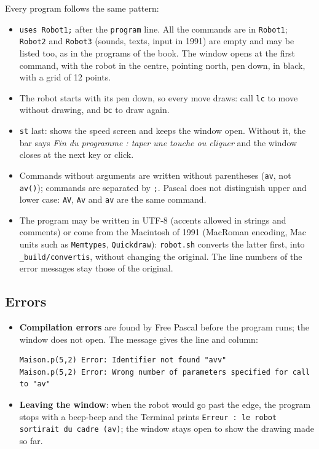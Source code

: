 \documentclass[11pt,a4paper]{article}
\newcommand{\kbd}[1]{\texttt{#1}}
\begin{document}
Every program follows the same pattern:
\begin{itemize}
\item \kbd{uses Robot1;} after the \kbd{program} line. All the commands are
  in \kbd{Robot1}; \kbd{Robot2} and \kbd{Robot3} (sounds, texts, input in
  1991) are empty and may be listed too, as in the programs of the book.
  The window opens at the first command, with the robot in the centre,
  pointing north, pen down, in black, with a grid of 12 points.
\item The robot starts with its pen down, so every move draws: call
  \kbd{lc} to move without drawing, and \kbd{bc} to draw again.
\item \kbd{st} last: shows the speed screen and keeps the window open.
  Without it, the bar says \emph{Fin du programme : taper une touche ou
  cliquer} and the window closes at the next key or click.
\item Commands without arguments are written without parentheses
  (\kbd{av}, not \kbd{av()}); commands are separated by \kbd{;}. Pascal
  does not distinguish upper and lower case: \kbd{AV}, \kbd{Av} and
  \kbd{av} are the same command.
\item The program may be written in UTF-8 (accents allowed in strings and
  comments) or come from the Macintosh of 1991 (MacRoman encoding, Mac
  units such as \kbd{Memtypes}, \kbd{Quickdraw}): \kbd{robot.sh} converts
  the latter first, into \kbd{\_build/convertis}, without changing the
  original. The line numbers of the error messages stay those of the
  original.
\end{itemize}

\subsection{Errors}
\begin{itemize}
\item \textbf{Compilation errors} are found by Free Pascal before the
  program runs; the window does not open. The message gives the line and
  column:
\begin{lstlisting}
Maison.p(5,2) Error: Identifier not found "avv"
Maison.p(5,2) Error: Wrong number of parameters specified for call to "av"
\end{lstlisting}
\item \textbf{Leaving the window}: when the robot would go past the edge,
  the program stops with a beep-beep and the Terminal prints
  \kbd{Erreur : le robot sortirait du cadre (av)}; the window stays open
  to show the drawing made so far.
\end{itemize}
\end{document}
